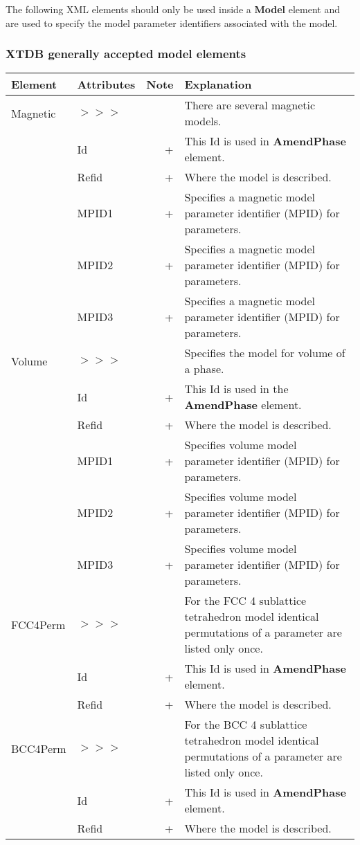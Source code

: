 \documentclass{article}
\begin{document}
The following XML elements should only be used inside a {\bf Model} element
and are used to specify the model parameter identifiers associated with the
model.

\subsubsection{XTDB generally accepted model elements}

\bigskip
\begin{tabular}{|p{} p{} r p{}|}\hline
  Element & Attributes & Note & Explanation\\\hline


  Magnetic &$>>>$&& There are several magnetic models.\\
      & Id & + & This Id is used in {\bf AmendPhase} element.\\
      & Refid & + & Where the model is described.\\
      & MPID1 & + & Specifies a magnetic model parameter identifier (MPID) for parameters.\\
      & MPID2 & + & Specifies a magnetic model parameter identifier (MPID) for parameters.\\
      & MPID3 & + & Specifies a magnetic model parameter identifier (MPID) for parameters.\\\hline

  Volume &$>>>$&& Specifies the model for volume of a phase.\\
      & Id & + & This Id is used in the {\bf AmendPhase} element.\\
      & Refid & + & Where the model is described.\\
      & MPID1 & + & Specifies volume model parameter identifier (MPID) for parameters.\\
      & MPID2 & + & Specifies volume model parameter identifier (MPID) for parameters.\\
      & MPID3 & + & Specifies volume model parameter identifier (MPID) for parameters.\\\hline

  FCC4Perm &$>>>$& & For the FCC 4 sublattice tetrahedron model identical permutations of a parameter are listed only once.\\
     & Id & + & This Id is used in {\bf AmendPhase} element.\\
     & Refid & + & Where the model is described.\\\hline

  BCC4Perm &$>>>$& & For the BCC 4 sublattice tetrahedron model identical permutations of a parameter are listed only once.\\
     & Id & + & This Id is used in {\bf AmendPhase} element.\\
     & Refid & + & Where the model is described.\\\hline

\end{tabular}
\end{document}
